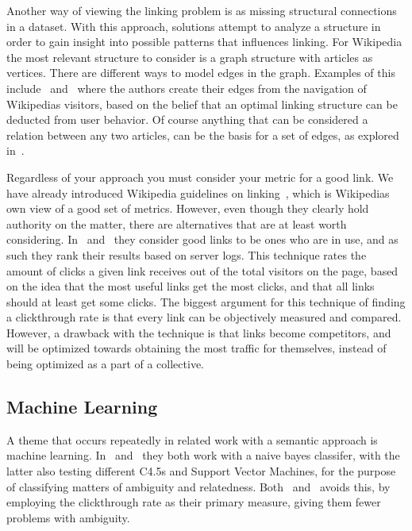 Another way of viewing the linking problem is as missing structural connections in a dataset. With this approach, solutions attempt to analyze a structure in order to gain insight into possible patterns that influences linking. For Wikipedia the most relevant structure to consider is a graph structure with articles as vertices. There are different ways to model edges in the graph. Examples of this include~\cite{hyperlink-structure-using-logs} and~\cite{west2015mining} where the authors create their edges from the navigation of Wikipedias visitors, based on the belief that an optimal linking structure can be deducted from user behavior. Of course anything that can be considered a relation between any two articles, can be the basis for a set of edges, as explored in~\cite{lu2011link}.

Regardless of your approach you must consider your metric for a good link. We have already introduced Wikipedia guidelines on linking~\cite{wiki-editor-guidelines}, which is Wikipedias own view of a good set of metrics. However, even though they clearly hold authority on the matter, there are alternatives that are at least worth considering. In~\cite{hyperlink-structure-using-logs} and~\cite{west2015mining} they consider good links to be ones who are in use, and as such they rank their results based on server logs. This technique rates the amount of clicks a given link receives out of the total visitors on the page, based on the idea that the most useful links get the most clicks, and that all links should at least get some clicks. The biggest argument for this technique of finding a clickthrough rate is that every link can be objectively measured and compared. However, a drawback with the technique is that links become competitors, and will be optimized towards obtaining the most traffic for themselves, instead of being optimized as a part of a collective.

\subsection{Machine Learning}\label{related_machine_learning}

A theme that occurs repeatedly in related work with a semantic approach is machine learning. In~\cite{mihalcea2007wikify} and~\cite{milne2008learning} they both work with a naive bayes classifer, with the latter also testing different C4.5s and Support Vector Machines, for the purpose of classifying matters of ambiguity and relatedness. Both~\cite{hyperlink-structure-using-logs} and~\cite{west2015mining} avoids this, by employing the clickthrough rate as their primary measure, giving them fewer problems with ambiguity.

